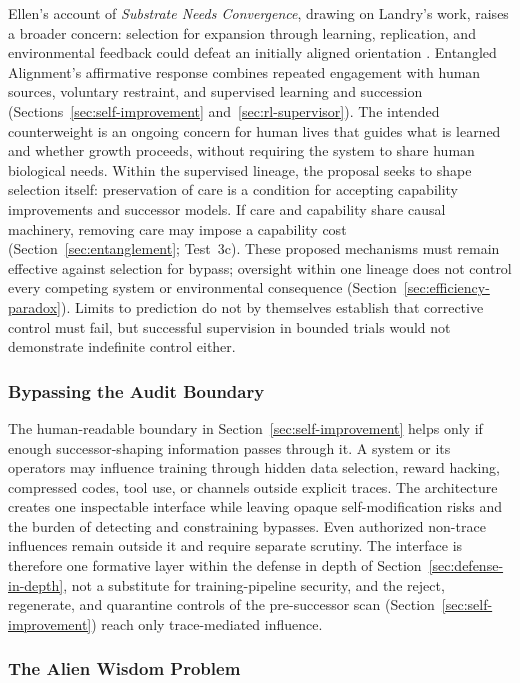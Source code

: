 \documentclass[11pt]{article}
\begin{document}
Ellen's account of \emph{Substrate Needs Convergence}, drawing on Landry's
work, raises a broader concern: selection for expansion through learning,
replication, and environmental feedback could defeat an initially aligned
orientation \cite{landry2020nopeople,ellen2023controlproblem}.
Entangled Alignment's affirmative response combines repeated engagement with human sources,
voluntary restraint, and supervised learning and succession
(Sections~\ref{sec:self-improvement} and~\ref{sec:rl-supervisor}). The intended counterweight is an ongoing
concern for human lives that guides what is learned and whether growth
proceeds, without requiring the system to share human biological needs.
Within the supervised lineage, the proposal seeks to shape selection itself: preservation
of care is a condition for accepting capability improvements and successor models.
If care and capability share causal machinery, removing care may impose a capability
cost (Section~\ref{sec:entanglement}; Test~3c). These proposed mechanisms must
remain effective against selection for bypass; oversight within one lineage
does not control every competing system or environmental consequence
(Section~\ref{sec:efficiency-paradox}). Limits to prediction do not by
themselves establish that corrective control must fail, but successful
supervision in bounded trials would not demonstrate indefinite control either.

\subsubsection{Bypassing the Audit Boundary}

The human-readable boundary in Section~\ref{sec:self-improvement} helps only
if enough successor-shaping information passes through it. A system or its
operators may influence training through hidden data selection, reward hacking,
compressed codes, tool use, or channels outside explicit traces. The architecture
creates one inspectable interface while leaving opaque self-modification risks
and the burden of detecting and constraining bypasses. Even authorized
non-trace influences remain outside it and require separate scrutiny.
The interface is therefore one formative layer within the defense in depth
of Section~\ref{sec:defense-in-depth}, not a substitute for training-pipeline
security, and the reject, regenerate, and quarantine controls of the
pre-successor scan (Section~\ref{sec:self-improvement}) reach only
trace-mediated influence.

\subsubsection{The Alien Wisdom Problem}
\label{sec:scaling-assumption}
\end{document}
